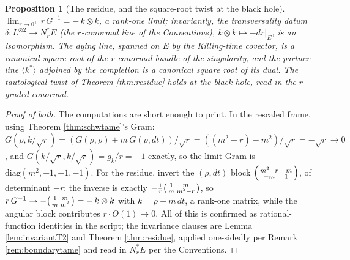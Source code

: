 \documentclass[11pt]{article}
\newtheorem{proposition}[theorem]{Proposition}
\theoremstyle{definition}
\newcommand{\shL}{L}
\newcommand{\dtPG}{dt}
\begin{document}
\begin{proposition}[The residue, and the square-root twist at the black hole]\label{prop:schwresidue}
$\displaystyle \lim_{r \to 0^+} r\,G^{-1} = -\,k \otimes k$, a rank-one limit; invariantly, the transversality datum $\delta : \shL^{\otimes 2} \to N^*_rE$ (the $r$-conormal line of the Conventions), $k \otimes k \mapsto -dr|_E$, is an isomorphism. The dying line, spanned on $E$ by the Killing-time covector, is a canonical square root of the $r$-conormal bundle of the singularity, and the partner line $\langle k^* \rangle$ adjoined by the completion is a canonical square root of its dual. The tautological twist of Theorem \ref{thm:residue} holds at the black hole, read in the $r$-graded conormal.
\end{proposition}

\begin{proof}[Proof of both]
The computations are short enough to print. In the rescaled frame, using Theorem \ref{thm:schwtame}'s Gram: $G(\rho, k/\sqrt r) = (G(\rho,\rho) + m\,G(\rho,\dtPG))/\sqrt r = ((m^2 - r) - m^2)/\sqrt r = -\sqrt r \to 0$, and $G(k/\sqrt r, k/\sqrt r) = g_k/r = -1$ exactly, so the limit Gram is $\mathrm{diag}(m^2, -1, -1, -1)$. For the residue, invert the $(\rho, \dtPG)$ block $\begin{psmallmatrix} m^2 - r & -m \\ -m & 1 \end{psmallmatrix}$, of determinant $-r$: the inverse is exactly $-\tfrac1r \begin{psmallmatrix} 1 & m \\ m & m^2 - r \end{psmallmatrix}$, so $r\,G^{-1} \to -\begin{psmallmatrix} 1 & m \\ m & m^2 \end{psmallmatrix} = -\,k \otimes k$ with $k = \rho + m\,\dtPG$, a rank-one matrix, while the angular block contributes $r \cdot O(1) \to 0$. All of this is confirmed as rational-function identities in the script; the invariance clauses are Lemma \ref{lem:invariantT2} and Theorem \ref{thm:residue}, applied one-sidedly per Remark \ref{rem:boundarytame} and read in $N^*_rE$ per the Conventions.
\end{proof}
\end{document}
